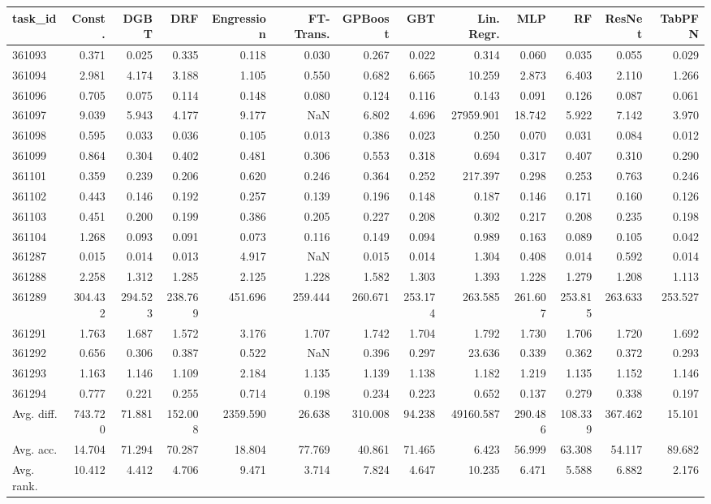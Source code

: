 \begin{tabular}{lrrrrrrrrrrrr}
\toprule
task\_id & Const. & DGBT & DRF & Engression & FT-Trans. & GPBoost & GBT & Lin. Regr. & MLP & RF & ResNet & TabPFN \\
\midrule
361093 & 0.371 & 0.025 & 0.335 & 0.118 & 0.030 & 0.267 & 0.022 & 0.314 & 0.060 & 0.035 & 0.055 & 0.029 \\
361094 & 2.981 & 4.174 & 3.188 & 1.105 & 0.550 & 0.682 & 6.665 & 10.259 & 2.873 & 6.403 & 2.110 & 1.266 \\
361096 & 0.705 & 0.075 & 0.114 & 0.148 & 0.080 & 0.124 & 0.116 & 0.143 & 0.091 & 0.126 & 0.087 & 0.061 \\
361097 & 9.039 & 5.943 & 4.177 & 9.177 & NaN & 6.802 & 4.696 & 27959.901 & 18.742 & 5.922 & 7.142 & 3.970 \\
361098 & 0.595 & 0.033 & 0.036 & 0.105 & 0.013 & 0.386 & 0.023 & 0.250 & 0.070 & 0.031 & 0.084 & 0.012 \\
361099 & 0.864 & 0.304 & 0.402 & 0.481 & 0.306 & 0.553 & 0.318 & 0.694 & 0.317 & 0.407 & 0.310 & 0.290 \\
361101 & 0.359 & 0.239 & 0.206 & 0.620 & 0.246 & 0.364 & 0.252 & 217.397 & 0.298 & 0.253 & 0.763 & 0.246 \\
361102 & 0.443 & 0.146 & 0.192 & 0.257 & 0.139 & 0.196 & 0.148 & 0.187 & 0.146 & 0.171 & 0.160 & 0.126 \\
361103 & 0.451 & 0.200 & 0.199 & 0.386 & 0.205 & 0.227 & 0.208 & 0.302 & 0.217 & 0.208 & 0.235 & 0.198 \\
361104 & 1.268 & 0.093 & 0.091 & 0.073 & 0.116 & 0.149 & 0.094 & 0.989 & 0.163 & 0.089 & 0.105 & 0.042 \\
361287 & 0.015 & 0.014 & 0.013 & 4.917 & NaN & 0.015 & 0.014 & 1.304 & 0.408 & 0.014 & 0.592 & 0.014 \\
361288 & 2.258 & 1.312 & 1.285 & 2.125 & 1.228 & 1.582 & 1.303 & 1.393 & 1.228 & 1.279 & 1.208 & 1.113 \\
361289 & 304.432 & 294.523 & 238.769 & 451.696 & 259.444 & 260.671 & 253.174 & 263.585 & 261.607 & 253.815 & 263.633 & 253.527 \\
361291 & 1.763 & 1.687 & 1.572 & 3.176 & 1.707 & 1.742 & 1.704 & 1.792 & 1.730 & 1.706 & 1.720 & 1.692 \\
361292 & 0.656 & 0.306 & 0.387 & 0.522 & NaN & 0.396 & 0.297 & 23.636 & 0.339 & 0.362 & 0.372 & 0.293 \\
361293 & 1.163 & 1.146 & 1.109 & 2.184 & 1.135 & 1.139 & 1.138 & 1.182 & 1.219 & 1.135 & 1.152 & 1.146 \\
361294 & 0.777 & 0.221 & 0.255 & 0.714 & 0.198 & 0.234 & 0.223 & 0.652 & 0.137 & 0.279 & 0.338 & 0.197 \\
Avg. diff. & 743.720 & 71.881 & 152.008 & 2359.590 & 26.638 & 310.008 & 94.238 & 49160.587 & 290.486 & 108.339 & 367.462 & 15.101 \\
Avg. acc. & 14.704 & 71.294 & 70.287 & 18.804 & 77.769 & 40.861 & 71.465 & 6.423 & 56.999 & 63.308 & 54.117 & 89.682 \\
Avg. rank. & 10.412 & 4.412 & 4.706 & 9.471 & 3.714 & 7.824 & 4.647 & 10.235 & 6.471 & 5.588 & 6.882 & 2.176 \\
\bottomrule
\end{tabular}
